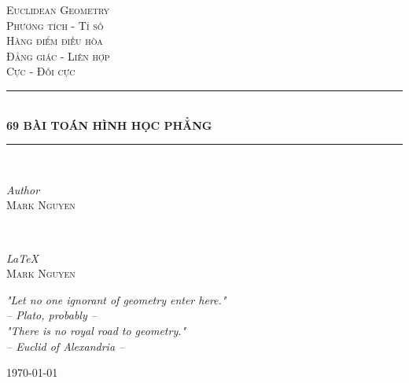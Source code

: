 \begin{titlepage}

    \newcommand{\HRule}{\rule{\linewidth}{0.5mm}} 
    \center
    
    
    \textsc{\LARGE Euclidean Geometry}\\[1.5cm] 
    \textsc{\Large Phương tích - Tỉ số}\\[0.5cm] 
    \textsc{\Large Hàng điểm điều hòa}\\[0.5cm] 
    \textsc{\Large Đẳng giác - Liên hợp}\\[0.5cm] 
    \textsc{\Large Cực - Đối cực}\\[1.5cm]
    
    
    \HRule\\[0.4cm]
    
    {\huge\bfseries 69 BÀI TOÁN HÌNH HỌC PHẲNG}\\[0.1cm]
    
    \HRule\\[1.5cm]
    
    
    \begin{minipage}{0.4\textwidth}
        \begin{flushleft}
            \large
            \textit{Author}\\
            \textsc{Mark Nguyen}
        \end{flushleft}
    \end{minipage}
    ~
    \begin{minipage}{0.4\textwidth}
        \begin{flushright}
            \large
            \textit{\LaTeX}\\
            \textsc{Mark Nguyen}
        \end{flushright}
    \end{minipage}
    

    \vfill\vfill

    \textit{"Let no one ignorant of geometry enter here."}\\[0.25cm]
    \textit{-- Plato, probably --}\\[0.75cm]

    \textit{"There is no royal road to geometry."}\\[0.25cm]
    \textit{-- Euclid of Alexandria --}
    
    
    \vfill\vfill\vfill
    {\large\today}

    \vfill
    
\end{titlepage}